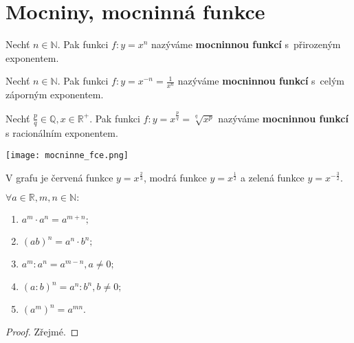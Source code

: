 \section{Mocniny, mocninná funkce}
\begin{minipage}{0.64\textwidth}
\begin{definition}
    Nechť $n\in \mathbb N.$ Pak funkci $f: y=x^n$ nazýváme \textbf{mocninnou funkcí}
    s~přirozeným exponentem.
\end{definition}

\begin{definition}
    Nechť $n\in \mathbb N.$ Pak funkci $f: y=x^{-n}=\frac{1}{x^n}$ nazýváme
    \textbf{mocninnou funkcí} s~celým záporným exponentem.
\end{definition}

\begin{definition}
    Nechť $\frac{p}{q}\in \mathbb Q, x \in \mathbb R^+.$ Pak funkci $f: y=
    x^{\frac{p}{q}}=\sqrt[q]{x^p}$ nazýváme \textbf{mocninnou funkcí}
    s racionálním exponentem.
\end{definition}
\end{minipage}
\hfill
\begin{minipage}{0.34\textwidth}
\vspace{-1em}\noindent\hfill\texttt{[image: mocninne\_fce.png]}
\end{minipage}

\begin{pozn}
    V grafu je červená funkce $y=x^\frac{2}{3}$, modrá funkce $y=x^\frac{1}{2}$ a
    zelená funkce $y=x^{-\frac{3}{2}}$.
\end{pozn}


\begin{veta}
    $\forall a \in \mathbb R, m,n \in \mathbb N:$
    \begin{enumerate}[$i.$]
        \item $a^m\cdot a^n=a^{m+n};$
       	\item $(ab)^n = a^n\cdot b^n;$
       	\item $a^m : a^n = a^{m-n}, a \ne 0;$
       	\item $(a : b)^n = a^n : b^n, b \ne 0;$
       	\item $\left ( a^m \right )^n = a^{mn}.$
    \end{enumerate}
\end{veta}

\begin{proof}
    Zřejmé.
\end{proof}

